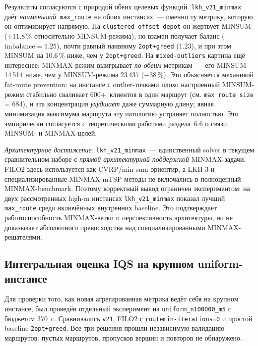 \documentclass[14pt,a4paper]{extarticle}
\begin{document}
Результаты согласуются с природой обеих целевых функций. \texttt{lkh\_v21\_minmax} даёт \emph{наименьший}~\texttt{max\_route} на обоих инстансах~--- именно ту метрику, которую он оптимизирует напрямую. На \texttt{clustered-offset-depot} он жертвует MINSUM ($+11.8\,\%$ относительно MINSUM-режима), но взамен получает баланс ($\mathrm{imbalance} = 1.25$), почти равный наивному \texttt{2opt+greed} (1.23), и при этом MINSUM на 10.6\,\% ниже, чем у \texttt{2opt+greed}. На \texttt{mixed-outliers} картина ещё интереснее: MINMAX-режим выигрывает \emph{по обеим} метрикам~--- его MINSUM 14\,514 ниже, чем у MINSUM-режима 23\,437 ($-38\,\%$). Это объясняется механикой fat-route prevention: на инстансе с outlier-точками плохо настроенный MINSUM-режим стабильно сваливает 600+~клиентов в один маршрут (см. \texttt{max route size} = 684), и эта концентрация \emph{ухудшает} даже суммарную длину; явная минимизация максимума маршрута эту патологию устраняет полностью. Это эмпирически согласуется с теоретическими работами раздела~6.6 о связи MINSUM- и MINMAX-целей.

\textit{Архитектурное достижение.} \texttt{lkh\_v21\_minmax}~--- единственный solver в текущем сравнительном наборе с \emph{прямой архитектурной поддержкой} MINMAX-задачи. FILO2 здесь используется как CVRP/min-sum ориентир, а LKH-3 и специализированные MINMAX-mTSP методы не включались в полноценный MINMAX-benchmark. Поэтому корректный вывод ограничен экспериментом: на двух рассмотренных high-m инстансах \texttt{lkh\_v21\_minmax} показал лучший \texttt{max\_route} среди включённых внутренних baseline. Это подтверждает работоспособность MINMAX-ветки и перспективность архитектуры, но не доказывает абсолютного превосходства над специализированными MINMAX-решателями.

\subsection{Интегральная оценка IQS на крупном uniform-инстансе}

Для проверки того, как новая агрегированная метрика ведёт себя на крупном инстансе, был проведён отдельный эксперимент на \texttt{uniform\_n100000\_m5} с бюджетом 370~с. Сравнивались \texttt{v21}, FILO2 с \texttt{routemin-iterations=0} и простой baseline \texttt{2opt+greed}. Все три решения прошли независимую валидацию маршрутов: пустых маршрутов, пропусков вершин и повторов не обнаружено.
\end{document}

